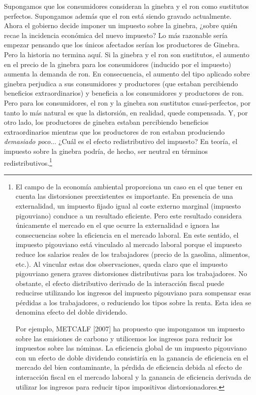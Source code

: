 \documentclass[10pt,a4paper]{article}
\begin{document}
Supongamos que los consumidores consideran la ginebra y el ron como sustitutos perfectos. Supongamos además que el ron está siendo gravado actualmente. Ahora el gobierno decide imponer un impuesto sobre la ginebra, ¿sobre quién recae la incidencia económica del nuevo impuesto? Lo más razonable sería empezar pensando que los únicos afectados serían los productores de Ginebra. Pero la historia no termina aquí. Si la ginebra y el ron son sustitutos, el aumento en el precio de la ginebra para los consumidores (inducido por el impuesto) aumenta la demanda de ron. En consecuencia, el aumento del tipo aplicado sobre ginebra perjudica a sus consumidores y productores (que estaban percibiendo beneficios extraordinarios) y beneficia a los consumidores y productores de ron. Pero para los consumidores, el ron y la ginebra son sustitutos cuasi-perfectos, por tanto lo más natural es que la distorsión, en realidad, quede compensada. Y, por otro lado, los productores de ginebra estaban percibiendo beneficios extraordinarios mientras que los productores de ron estaban produciendo \textit{demasiado poco}... ¿Cuál es el efecto redistributivo del impuesto? En teoría, el impuesto sobre la ginebra podría, de hecho, ser neutral en términos redistributivos.\footnote{%
    El campo de la economía ambiental proporciona un caso en el que tener en cuenta las distorsiones preexistentes es importante. En presencia de una externalidad, un impuesto fijado igual al coste externo marginal (impuesto pigouviano) conduce a un resultado eficiente. Pero este resultado considera únicamente el mercado en el que ocurre la externalidad e ignora las consecuencias sobre la eficiencia en el mercado laboral. En este sentido, el impuesto pigouviano está vinculado al mercado laboral porque el impuesto reduce los salarios reales de los trabajadores (precio de la gasolina, alimentos, etc.). Al vincular estas dos observaciones, queda claro que el impuesto pigouviano genera graves distorsiones distributivas para los trabajadores. No obstante, el efecto distributivo derivado de la interacción fiscal puede reducirse utilizando los ingresos del impuesto pigouviano para sompensar esas pérdidas a los trabajadores, o reduciendo los tipos sobre la renta. Esta idea se denomina efecto del doble dividendo. 

Por ejemplo, METCALF [2007] ha propuesto que impongamos un impuesto sobre las emisiones de carbono y utilicemos los ingresos para reducir los impuestos sobre las nóminas. La eficiencia global de un impuesto pigouviano con un efecto de doble dividendo consistiría en la ganancia de eficiencia en el mercado del bien contaminante, la pérdida de eficiencia debida al efecto de interacción fiscal en el mercado laboral y la ganancia de eficiencia derivada de utilizar los ingresos para reducir tipos impositivos distorsionadores.
}
\end{document}
